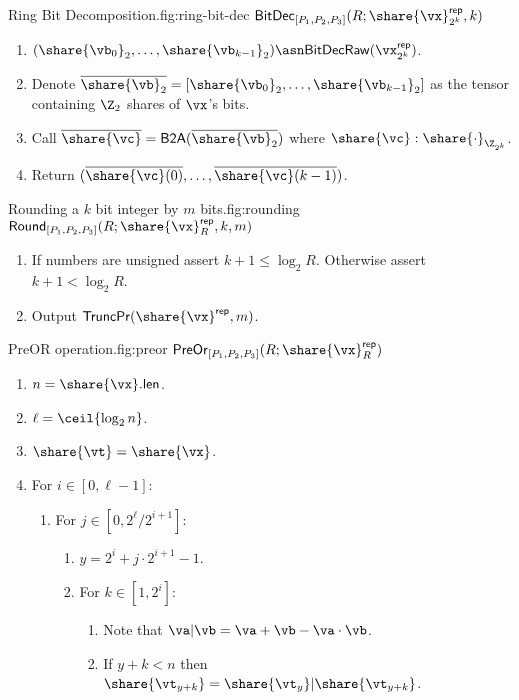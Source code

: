 \begin{Boxfig}{Ring Bit Decomposition.}{fig:ring-bit-dec}
  {$\mathsf{BitDec}_{[P_1, P_2, P_3]}(R; \share{\vx}^\mathsf{rep}_{2^k}, k)$}
  \begin{enumerate}
  \item $(\share{\vb_0}_2, \dots, \share{\vb_{k-1}}_2) \asn \mathsf{BitDecRaw}(\vx^\mathsf{rep}_{2^k})$.
  \item Denote $\overline{\share{\vb}_2} = [\share{\vb_0}_2, \dots, \share{\vb_{k-1}}_2]$ as the tensor containing $\Z_2$ shares of $\vx$'s bits.
  \item Call $\overline{\share{\vc}} = \mathsf{B2A}(\overline{\share{\vb}_2})$ where $\share{\vc}: \share{\cdot}_{\Z_{2^k}}$.
  \item Return $(\overline{\share{\vc}(0)}, \dots, \overline{\share{\vc}(k-1)})$.
\end{enumerate}
\end{Boxfig}


\begin{Boxfig}{Rounding a $k$ bit integer by $m$ bits.}{fig:rounding}
  {$\mathsf{Round}_{[P_1, P_2, P_3]}(R; \share{\vx}^\mathsf{rep}_R, k, m)$}
  \begin{enumerate}
  \item If numbers are unsigned assert $k + 1 \leq \log_2{R}$. Otherwise assert $k+1 < \log_2{R}$.
  \item Output $\mathsf{TruncPr}(\share{\vx}^\mathsf{rep}, m)$.
\end{enumerate}
\end{Boxfig}

\begin{Boxfig}{PreOR operation.}{fig:preor}
  {$\mathsf{PreOr}_{[P_1, P_2, P_3]}(R; \share{\vx}^\mathsf{rep}_R)$}
  \begin{enumerate}
    \item $n = \share{\vx}.\mathsf{len}$.
    \item $\ell = \ceil{\log_2{n}}$.
    \item $\share{\vt} = \share{\vx}$.
    \item For $i \in [0, \ell-1]$:
    \begin{enumerate}
      \item For $j \in [0, 2^\ell/2^{i+1}]$:
      \begin{enumerate}
        \item $y = 2^i + j \cdot 2^{i+1} - 1$.
        \item For $k \in [1, 2^i]$:
        \begin{enumerate}
            \item Note that $\va | \vb = \va + \vb - \va \cdot \vb$.
            \item If $y + k < n$ then $\share{\vt_{y+k}} = \share{\vt_y} | \share{\vt_{y + k}}$.
        \end{enumerate}
      \end{enumerate}
    \end{enumerate}
\end{enumerate}
\end{Boxfig}

